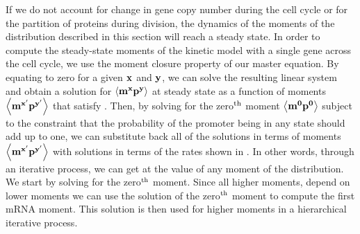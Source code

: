 If we do not account for change in gene copy number during the cell cycle or for
the partition of proteins during division, the dynamics of the moments of the
distribution described in this section will reach a steady state. In order to
compute the steady-state moments of the kinetic model with a single gene across
the cell cycle, we use the moment closure property of our master equation. By
equating  to zero for a given $\mathbf{x}$ and
$\mathbf{y}$, we can solve the resulting linear system and obtain a solution for
$\mathbf{\left\langle m^x p^y \right\rangle}$ at steady state as a function of moments $\mathbf{\left\langle m^{x'}
p^{y'} \right\rangle}$ that satisfy . Then, by solving for the
zero$^\text{th}$ moment $\mathbf{\left\langle m^0 p^0 \right\rangle}$ subject to the constraint that the
probability of the promoter being in any state should add up to one, we can
substitute back all of the solutions in terms of moments $\mathbf{\left\langle m^{x'}
p^{y'} \right\rangle}$ with solutions in terms of the rates shown in
. In other words, through an iterative process, we can
get at the value of any moment of the distribution. We start by solving for the
zero$^\text{th}$ moment. Since all higher moments, depend on lower moments we can use
the solution of the zero$^\text{th}$ moment to compute the first mRNA moment. This
solution is then used for higher moments in a hierarchical iterative process.
